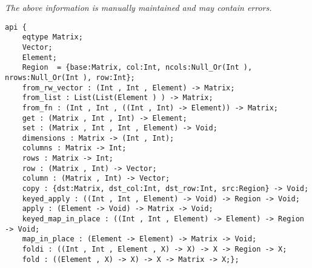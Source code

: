 \label{api:Typelocked\_Matrix}

{\tiny \it The above information is manually maintained and may contain errors.}
\begin{verbatim}
api {
    eqtype Matrix;
    Vector;
    Element;
    Region  = {base:Matrix, col:Int, ncols:Null_Or(Int ), nrows:Null_Or(Int ), row:Int};
    from_rw_vector : (Int , Int , Element) -> Matrix;
    from_list : List(List(Element ) ) -> Matrix;
    from_fn : (Int , Int , ((Int , Int) -> Element)) -> Matrix;
    get : (Matrix , Int , Int) -> Element;
    set : (Matrix , Int , Int , Element) -> Void;
    dimensions : Matrix -> (Int , Int);
    columns : Matrix -> Int;
    rows : Matrix -> Int;
    row : (Matrix , Int) -> Vector;
    column : (Matrix , Int) -> Vector;
    copy : {dst:Matrix, dst_col:Int, dst_row:Int, src:Region} -> Void;
    keyed_apply : ((Int , Int , Element) -> Void) -> Region -> Void;
    apply : (Element -> Void) -> Matrix -> Void;
    keyed_map_in_place : ((Int , Int , Element) -> Element) -> Region -> Void;
    map_in_place : (Element -> Element) -> Matrix -> Void;
    foldi : ((Int , Int , Element , X) -> X) -> X -> Region -> X;
    fold : ((Element , X) -> X) -> X -> Matrix -> X;};
\end{verbatim}
